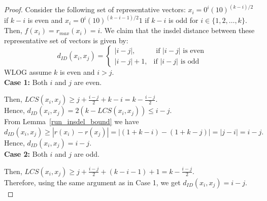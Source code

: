 \documentclass[11 pt]{article}
\numberwithin{equation}{section}
\begin{document}
    \begin{proof}
        Consider the following set of representative vectors: $x_i =0^i(10)^{(k-i)/2}$ if $k-i$ is even and $x_i =0^i(10)^{(k-i-1)/2}1$ if $k-i$ is odd for $i \in \{1,2,\ldots,k\}$. Then, $f(x_i) = r_{max}(x_i) = i$. We claim that the insdel distance between these representative set of vectors is given by:
        \[
            d_{ID}(x_i, x_j) =
            \begin{cases}
                |i-j|, & \text{ if $|i-j|$ is even}\\
                |i - j| + 1, & \text{if $|i-j|$ is odd}
            \end{cases}
        \]
        WLOG assume $k$ is even and $i > j$.\\
        \noindent \textbf{Case 1:} Both $i$ and $j$ are even.
        
        \smallskip
        \noindent Then, $LCS(x_i,x_j) \geq j + \frac{i-j}{2} + k- i = k - \frac{i-j}{2}.$\\
        Hence, $d_{ID}(x_i,x_j) = 2(k - LCS(x_i,x_j)) \leq i-j$.\\
        From Lemma~\ref{run_insdel_bound} we have $d_{ID}(x_i,x_j) \geq |r(x_i) - r(x_j)| = |(1 + k -i) -(1 + k - j)| = |j-i| = i-j.$\\
        Hence, $d_{ID}(x_i, x_j) = i-j$.\\
        
        \noindent \textbf{Case 2:} Both $i$ and $j$ are odd.
        
        \smallskip
        \noindent Then, $LCS(x_i,x_j) \geq j + \frac{i-j}{2} + ( k- i-1) +1 = k - \frac{i-j}{2}.$\\
        Therefore, using the same argument as in Case 1, we get $d_{ID}(x_i, x_j) = i-j$.\\
        
        

\end{proof}
\end{document}

